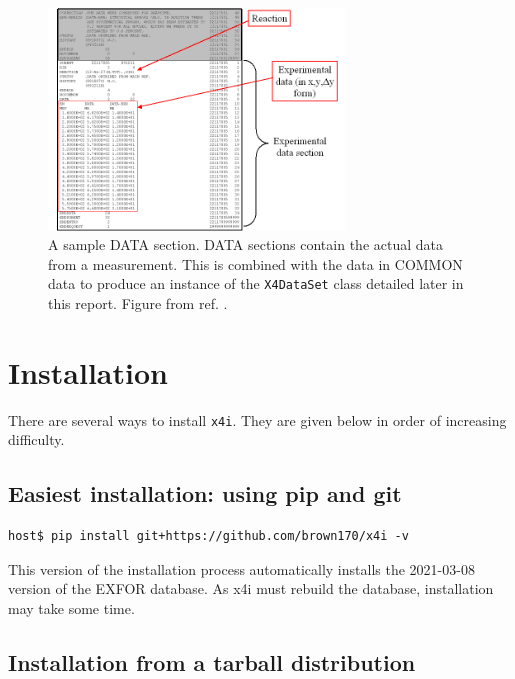 \documentclass[11pt]{article}
\newcommand{\xfouri}{\texttt{x4i}}
\begin{document}
\begin{figure}[htbp]
\begin{center}
\includegraphics[width=0.7\textwidth]{figs/bib04.png}
\caption{\label{fig:5}A sample DATA section.  DATA sections contain the actual data from a measurement.   This is combined with the data in COMMON data to produce an instance of the \texttt{X4DataSet} class detailed later in this report.  Figure from ref. \cite{web}.}
\end{center}
\end{figure}

\clearpage

\section{Installation}
There are several ways to install \xfouri.  They are given below in order of increasing difficulty.

\subsection{Easiest installation: using pip and git}
\begin{verbatim}
host$ pip install git+https://github.com/brown170/x4i -v
\end{verbatim}
This version of the installation process automatically installs the 2021-03-08 version of the EXFOR database.  As x4i must rebuild the database,
installation may take some time.

\subsection{Installation from a tarball distribution}
\end{document}
